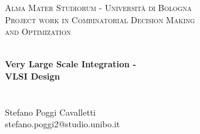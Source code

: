 
\begin{titlepage}
\vbox{ }
\vbox{ }
\begin{center}
\textsc{\LARGE Alma Mater Studiorum - Università di Bologna}\\[1.5cm]
\textsc{\Large Project work in Combinatorial Decision Making \\ and Optimization}\\[0.5cm]
\vbox{ }

\vfill
\HRule \\[0.4cm]
{ \huge \bfseries Very Large Scale Integration - \\ VLSI Design}\\[0.4cm]
\HRule \\[1.5cm]

\vfill
\Large
\emph \\
Stefano Poggi Cavalletti
\\
stefano.poggi2@studio.unibo.it
\vfill

\end{center}
\end{titlepage}